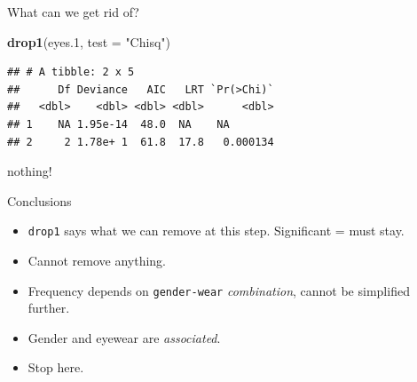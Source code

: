 \documentclass[
  ignorenonframetext,
]{beamer}
\newenvironment{Shaded}{\begin{snugshade}}{\end{snugshade}}
\newcommand{\DataTypeTok}[1]{\textcolor[rgb]{0.13,0.29,0.53}{#1}}
\newcommand{\FloatTok}[1]{\textcolor[rgb]{0.00,0.00,0.81}{#1}}
\newcommand{\KeywordTok}[1]{\textcolor[rgb]{0.13,0.29,0.53}{\textbf{#1}}}
\newcommand{\NormalTok}[1]{#1}
\newcommand{\StringTok}[1]{\textcolor[rgb]{0.31,0.60,0.02}{#1}}
\begin{document}
\begin{frame}[fragile]{What can we get rid of?}
\protect\hypertarget{what-can-we-get-rid-of}{}

\small

\begin{Shaded}
\begin{Highlighting}[]
\KeywordTok{drop1}\NormalTok{(eyes}\FloatTok{.1}\NormalTok{, }\DataTypeTok{test =} \StringTok{"Chisq"}\NormalTok{)}
\end{Highlighting}
\end{Shaded}

\begin{verbatim}
## # A tibble: 2 x 5
##      Df Deviance   AIC   LRT `Pr(>Chi)`
##   <dbl>    <dbl> <dbl> <dbl>      <dbl>
## 1    NA 1.95e-14  48.0  NA    NA       
## 2     2 1.78e+ 1  61.8  17.8   0.000134
\end{verbatim}

nothing!

\end{frame}

\begin{frame}[fragile]{Conclusions}
\protect\hypertarget{conclusions-4}{}

\begin{itemize}
\item
  \texttt{drop1} says what we can remove at this step. Significant =
  must stay.
\item
  Cannot remove anything.
\item
  Frequency depends on \texttt{gender-wear} \emph{combination}, cannot
  be simplified further.
\item
  Gender and eyewear are \emph{associated}.
\item
  Stop here.
\end{itemize}

\end{frame}
\end{document}
